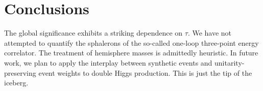 \section{Conclusions}\label{sec:conclusions}

The global significance exhibits a striking dependence on $\tau$. We
have not attempted to quantify the sphalerons of the so-called one-loop
three-point energy correlator. The treatment of hemisphere masses is
admittedly heuristic. In future work, we plan to apply the interplay
between synthetic events and unitarity-preserving event weights to
double Higgs production. This is just the tip of the iceberg.

